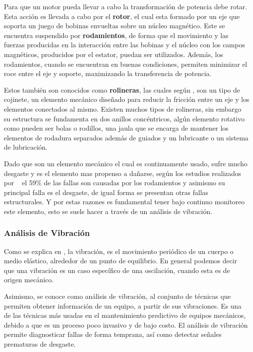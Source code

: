 Para que un motor pueda llevar a cabo la transformación de potencia debe rotar.
Esta acción es llevada a cabo por el \textbf{rotor}, el cual esta formado por un
eje que soporta un juego de bobinas envueltas sobre un núcleo magnético. Este
se encuentra suspendido por \textbf{rodamientos}, de forma que el movimiento y
las fuerzas producidas en la interacción entre las bobinas y el núcleo con los
campos magnéticos, producidos por el estator, puedan ser utilizados. Además,
los rodamientos, cuando se encuentran en buenas condiciones, permiten minimizar
el roce entre el eje y soporte, maximizando la transferencia de potencia.

Estos también son conocidos como \textbf{rolineras}, las cuales según
\cite{rodamiento},  son un tipo de cojinete,
un elemento mecánico diseñado para reducir la fricción entre un eje y los
elementos conectados al mismo. Existen muchos tipos de rolineras, sin embargo
su estructura se fundamenta en dos anillos concéntricos, algún elemento rotativo
como pueden ser bolas o rodillos, una jaula que se encarga de mantener los
elementos de rodadura separados además de guiados y un lubricante o un sistema
de lubricación.

Dado que son un elemento mecánico el cual es continuamente usado, sufre mucho
desgaste y es el elemento mas propenso a dañarse, según los estudios realizados
por ~\textcite{Kammermann} el 59\% de las fallas son causadas por los rodamientos
y asimismo su principal falla es el desgaste, de igual forma se presentan
otras fallas estructurales. Y por estas razones es fundamental tener bajo continuo
monitoreo este elemento, esto se suele hacer a través de un análisis de vibración.


\subsubsection{Análisis de Vibración}

Como se explica en \Cite{wiki:Vibration}, la vibración, es el  movimiento
periódico de un cuerpo o medio
elástico, alrededor de un punto de equilibrio. En general podemos decir que una
vibración es un caso específico de una oscilación, cuando esta es de origen
mecánico.

Asimismo, se conoce como análisis de vibración, al conjunto de técnicas que permiten
obtener información de un equipo, a partir de sus vibraciones. Es una de las
técnicas más usadas en el mantenimiento predictivo de equipos mecánicos, debido
a que es un proceso poco invasivo y de bajo costo. El análisis de vibración
permite diagnosticar fallas de forma temprana, así como detectar señales
prematuras de desgaste.

